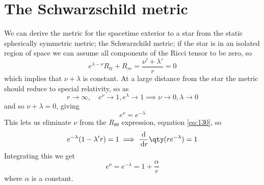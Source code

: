 \section{The Schwarzschild metric}
\label{sec:schwarzschild-metric}

We can derive the metric for the spacetime exterior to a star from the
static spherically symmetric metric; the Schwarzchild metric; if the
star is in an isolated region of space we can assume all components of
the Ricci tensor to be zero, so
\begin{equation}
  \label{eq:127}
  e^{\lambda-\nu}R_{tt}+R_{rr} = \frac{\nu'+\lambda'}{r}=0
\end{equation}
which implies that $\nu+\lambda$ is constant. At a large distance from
the star the metric should reduce to special relativity, so as
\[ r \to \infty, \quad e^{\nu}\to 1, e^{\lambda} \to 1 \implies \nu \to 0, \lambda \to 0\]
and so $\nu+\lambda=0$, giving
\begin{equation}
  \label{eq:128}
  e^{\nu} = e^{-\lambda}
\end{equation}
This lets us eliminate $\nu$ from the $R_{\theta\theta}$ expression,
equation \eqref{eq:130}, so
\begin{equation}
  \label{eq:132}
  e^{-\lambda} (1-\lambda'r) = 1 \implies \dv{r} \qty(r e^{-\lambda})=1
\end{equation}
Integrating this we get
\begin{equation}
  \label{eq:133}
  e^{\nu} = e^{-\lambda} = 1 + \frac{\alpha}{r}
\end{equation}
where $\alpha$ is a constant.

